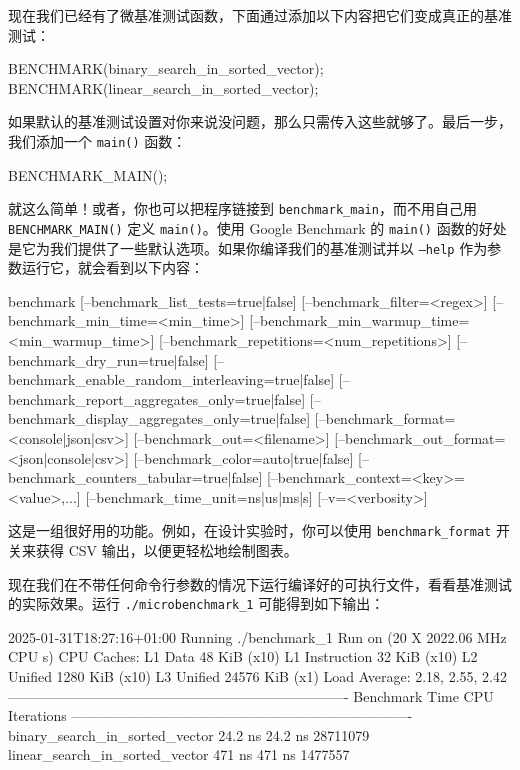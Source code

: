 现在我们已经有了微基准测试函数，下面通过添加以下内容把它们变成真正的基准测试：

\begin{codebox}[text]
BENCHMARK(binary_search_in_sorted_vector);
BENCHMARK(linear_search_in_sorted_vector);
\end{codebox}

如果默认的基准测试设置对你来说没问题，那么只需传入这些就够了。最后一步，我们添加一个 \texttt{main()} 函数：

\begin{codebox}[text]
BENCHMARK_MAIN();
\end{codebox}

就这么简单！或者，你也可以把程序链接到 \texttt{benchmark\_\allowbreak{}main}，而不用自己用 \texttt{BENCHMARK\_\allowbreak{}MAIN(\allowbreak{})\allowbreak{}} 定义 \texttt{main()}。使用 Google Benchmark 的 \texttt{main()} 函数的好处是它为我们提供了一些默认选项。如果你编译我们的基准测试并以 \texttt{--help} 作为参数运行它，就会看到以下内容：

\begin{codebox}[text]
benchmark [--benchmark_list_tests={true|false}]
          [--benchmark_filter=<regex>]
          [--benchmark_min_time=<min_time>]
          [--benchmark_min_warmup_time=<min_warmup_time>]
          [--benchmark_repetitions=<num_repetitions>]
          [--benchmark_dry_run={true|false}]
          [--benchmark_enable_random_interleaving={true|false}]
          [--benchmark_report_aggregates_only={true|false}]
          [--benchmark_display_aggregates_only={true|false}]
          [--benchmark_format=<console|json|csv>]
          [--benchmark_out=<filename>]
          [--benchmark_out_format=<json|console|csv>]
          [--benchmark_color={auto|true|false}]
          [--benchmark_counters_tabular={true|false}]
          [--benchmark_context=<key>=<value>,...]
          [--benchmark_time_unit={ns|us|ms|s}]
          [--v=<verbosity>]
\end{codebox}

这是一组很好用的功能。例如，在设计实验时，你可以使用 \texttt{benchmark\_\allowbreak{}format} 开关来获得 CSV 输出，以便更轻松地绘制图表。

\label{idx:1167}
现在我们在不带任何命令行参数的情况下运行编译好的可执行文件，看看基准测试的实际效果。运行 \texttt{.\allowbreak{}/\allowbreak{}microbenchmark\_\allowbreak{}1} 可能得到如下输出：

\begin{codebox}[text]
2025-01-31T18:27:16+01:00
Running ./benchmark_1
Run on (20 X 2022.06 MHz CPU s)
CPU Caches:
  L1 Data 48 KiB (x10)
  L1 Instruction 32 KiB (x10)
  L2 Unified 1280 KiB (x10)
  L3 Unified 24576 KiB (x1)
Load Average: 2.18, 2.55, 2.42
-------------------------------------------------------------------------
Benchmark                Time       CPU  Iterations
-------------------------------------------------------------------------
binary_search_in_sorted_vector       24.2 ns         24.2 ns     28711079
linear_search_in_sorted_vector        471 ns          471 ns      1477557
\end{codebox}

